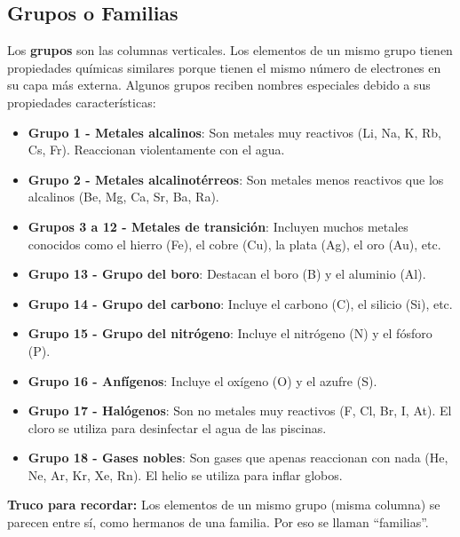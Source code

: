 \subsection{Grupos o Familias}
Los \textbf{grupos} son las columnas verticales. Los elementos de un mismo grupo tienen propiedades químicas similares porque tienen el mismo número de electrones en su capa más externa.
Algunos grupos reciben nombres especiales debido a sus propiedades características:
\begin{itemize}
    \item \textbf{Grupo 1 - Metales alcalinos}: Son metales muy reactivos (Li, Na, K, Rb, Cs, Fr). Reaccionan violentamente con el agua.
    \item \textbf{Grupo 2 - Metales alcalinotérreos}: Son metales menos reactivos que los alcalinos (Be, Mg, Ca, Sr, Ba, Ra).
    \item \textbf{Grupos 3 a 12 - Metales de transición}: Incluyen muchos metales conocidos como el hierro (Fe), el cobre (Cu), la plata (Ag), el oro (Au), etc.
    \item \textbf{Grupo 13 - Grupo del boro}: Destacan el boro (B) y el aluminio (Al).
    \item \textbf{Grupo 14 - Grupo del carbono}: Incluye el carbono (C), el silicio (Si), etc.
    \item \textbf{Grupo 15 - Grupo del nitrógeno}: Incluye el nitrógeno (N) y el fósforo (P).
    \item \textbf{Grupo 16 - Anfígenos}: Incluye el oxígeno (O) y el azufre (S).
    \item \textbf{Grupo 17 - Halógenos}: Son no metales muy reactivos (F, Cl, Br, I, At). El cloro se utiliza para desinfectar el agua de las piscinas.
    \item \textbf{Grupo 18 - Gases nobles}: Son gases que apenas reaccionan con nada (He, Ne, Ar, Kr, Xe, Rn). El helio se utiliza para inflar globos.
\end{itemize}
\begin{remark}
    \textbf{Truco para recordar:} Los elementos de un mismo grupo (misma columna) se parecen entre sí, como hermanos de una familia. Por eso se llaman ``familias''.
\end{remark}
